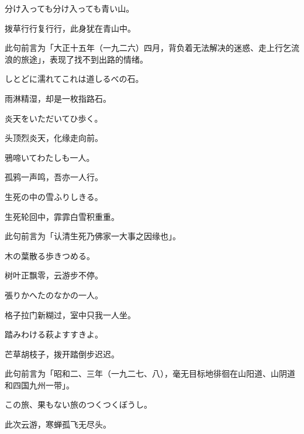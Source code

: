 \begin{haiku}
    {\FH 分け入っても分け入っても青い山。}

    {\FK 拨草行行复行行，此身犹在青山中。}

    {\FS 此句前言为「大正十五年（一九二六）四月，背负着无法解决的迷惑、走上行乞流浪的旅途」，表现了找不到出路的情绪。}
\end{haiku}

\begin{haiku}
    {\FH しとどに濡れてこれは道しるべの石。}

    {\FK 雨淋精湿，却是一枚指路石。}
\end{haiku}

\begin{haiku}
    {\FH 炎天をいただいてひ歩く。}

    {\FK 头顶烈炎天，化缘走向前。}
\end{haiku}

\begin{haiku}
    {\FH 鴉啼いてわたしも一人。}

    {\FK 孤鸦一声鸣，吾亦一人行。}
\end{haiku}

\begin{haiku}
    {\FH 生死の中の雪ふりしきる。}

    {\FK 生死轮回中，霏霏白雪积重重。}

    {\FS 此句前言为「认清生死乃佛家一大事之因缘也」。}
\end{haiku}

\begin{haiku}
    {\FH 木の葉散る歩きつめる。}

    {\FK 树叶正飘零，云游步不停。}
\end{haiku}

\begin{haiku}
    {\FH 張りかへたのなかの一人。}

    {\FK 格子拉门新糊过，室中只我一人坐。}
\end{haiku}

\begin{haiku}
    {\FH 踏みわける萩よすすきよ。}

    {\FK 芒草胡枝子，拨开踏倒步迟迟。}

    {\FS 此句前言为「昭和二、三年（一九二七、八），毫无目标地徘徊在山阳道、山阴道和四国九州一带」。}
\end{haiku}

\begin{haiku}
    {\FH この旅、果もない旅のつくつくぼうし。}

    {\FK 此次云游，寒蝉孤飞无尽头。}
\end{haiku}

